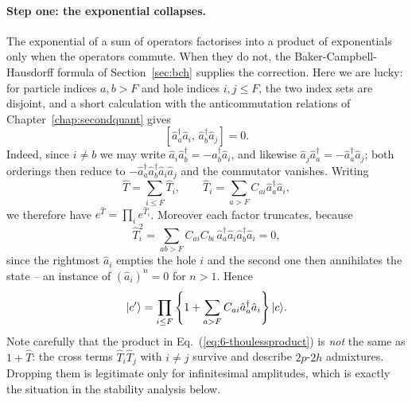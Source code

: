 \paragraph{Step one: the exponential collapses.}
The exponential of a sum of operators factorises into a product of
exponentials only when the operators commute.  When they do not, the
Baker-Campbell-Hausdorff formula of Section~\ref{sec:bch} supplies the
correction.  Here we are lucky: for particle indices $a,b>F$ and hole indices
$i,j\le F$, the two index sets are disjoint, and a short calculation with the
anticommutation relations of Chapter~\ref{chap:secondquant} gives
\begin{equation}
  \left[\hat{a}^{\dagger}_{a}\hat{a}_{i},\,
        \hat{a}^{\dagger}_{b}\hat{a}_{j}\right] = 0 .
  \label{eq:6-phcommute}
\end{equation}
Indeed, since $i\ne b$ we may write
$\hat{a}_{i}\hat{a}^{\dagger}_{b}=-\hat{a}^{\dagger}_{b}\hat{a}_{i}$, and
likewise $\hat{a}_{j}\hat{a}^{\dagger}_{a}
=-\hat{a}^{\dagger}_{a}\hat{a}_{j}$; both orderings then reduce to
$-\hat{a}^{\dagger}_{a}\hat{a}^{\dagger}_{b}\hat{a}_{i}\hat{a}_{j}$ and the
commutator vanishes.  Writing
\begin{equation}
  \hat{T} = \sum_{i\le F}\hat{T}_i,
  \qquad
  \hat{T}_i = \sum_{a>F}C_{ai}\hat{a}^{\dagger}_{a}\hat{a}_{i},
  \label{eq:6-Tsplit}
\end{equation}
we therefore have $e^{\hat{T}}=\prod_i e^{\hat{T}_i}$.  Moreover each factor
truncates, because
\begin{equation}
  \hat{T}_i^2 = \sum_{ab>F}C_{ai}C_{bi}\,
    \hat{a}^{\dagger}_{a}\hat{a}_{i}\hat{a}^{\dagger}_{b}\hat{a}_{i} = 0 ,
  \label{eq:6-Tsquared}
\end{equation}
since the rightmost $\hat{a}_i$ empties the hole $i$ and the second one then
annihilates the state -- an instance of $(\hat{a}_i)^n=0$ for $n>1$.  Hence
\begin{equation}
  \vert c' \rangle = \prod_{i\le F}
    \left\{1+\sum_{a>F}C_{ai}\hat{a}^{\dagger}_{a}\hat{a}_{i}\right\}\vert c \rangle.
  \label{eq:6-thoulessproduct}
\end{equation}
Note carefully that the product in
Eq.~(\ref{eq:6-thoulessproduct}) is \emph{not} the same as
$1+\hat{T}$: the cross terms $\hat{T}_i\hat{T}_j$ with $i\ne j$ survive and
describe $2p$-$2h$ admixtures.  Dropping them is legitimate only for
infinitesimal amplitudes, which is exactly the situation in the stability
analysis below.

